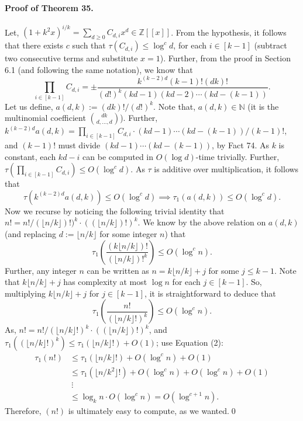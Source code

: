 \paragraph{Proof of Theorem 35.} Let, $(1+k^2x)^{i/k}=\sum_{d\ge0}C_{d,i}x^d\in\mathbb Z[[x]]$. From the hypothesis, it follows that there exists $c$ such that $\tau(C_{d,i})\le\log^cd$, for each $i\in[k-1]$ (subtract two consecutive terms and substitute $x=1$). Further, from the proof in Section 6.1 (and following the same notation), we know that
\[\prod_{i\in[k-1]}C_{d,i}=\pm\frac{k^{(k-2)d}(k-1)!(dk)!}{(d!)^k(kd-1)(kd-2)\cdots(kd-(k-1))}.\]
Let us define, $a(d,k):=(dk)!/(d!)^k$. Note that, $a(d,k)\in\mathbb N$ (it is the multinomial coefficient $\binom{dk}{d,\ldots,d}$). Further, $k^{(k-2)d}a(d,k)=\prod_{i\in[k-1]}C_{d,i}\cdot(kd-1)\cdots(kd-(k-1))/(k-1)!$, and $(k-1)!$ must divide $(kd-1)\cdots(kd-(k-1))$, by Fact 74. As $k$ is constant, each $kd-i$ can be computed in $O(\log d)$-time trivially. Further, $\tau(\prod_{i\in[k-1]}C_{d,i})\le O(\log^cd)$. As $\tau$ is additive over multiplication, it follows that
\[\tau(k^{(k-2)d}a(d,k))\le O(\log^cd)\implies\tau_1(a(d,k))\le O(\log^cd).\]
Now we recurse by noticing the following trivial identity that $n!=n!/(\lfloor n/k\rfloor)!)^k\cdot((\lfloor n/k\rfloor)!)^k$. We know by the above relation on $a(d,k)$ (and replacing $d:=\lfloor n/k\rfloor$ for some integer $n$) that
\[\tau_1\left(\frac{(k\lfloor n/k\rfloor)!}{(\lfloor n/k\rfloor)!^k}\right)\le O(\log^cn).\]
Further, any integer $n$ can be written as $n=k\lfloor n/k\rfloor+j$ for some $j\le k-1$. Note that $k\lfloor n/k\rfloor+j$ has complexity at most $\log n$ for each $j\in[k-1]$. So, multiplying $k\lfloor n/k\rfloor+j$ for $j\in[k-1]$, it is straightforward to deduce that
\[\tau_1\left(\frac{n!}{(\lfloor n/k\rfloor!)^k}\right)\le O(\log^cn).\tag{2}\]
As, $n!=n!/(\lfloor n/k\rfloor!)^k\cdot((\lfloor n/k\rfloor)!)^k$, and $\tau_1((\lfloor n/k\rfloor!)^k)\le\tau_1(\lfloor n/k\rfloor!)+O(1)$; use Equation (2):
\begin{align*}\tau_1(n!)&\le\tau_1(\lfloor n/k\rfloor!)+O(\log^cn)+O(1)\\&\le\tau_1(\lfloor n/k^2\rfloor!)+O(\log^cn)+O(\log^cn)+O(1)\\&\ \vdots\\&\le\log_kn\cdot O(\log^cn)=O(\log^{c+1}n).\end{align*}
Therefore, $(n!)$ is ultimately easy to compute, as we wanted.\qed
